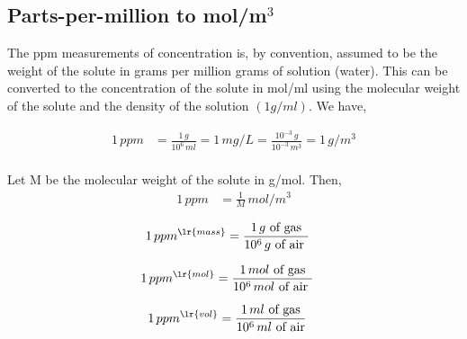 \subsection{Parts-per-million to mol/m$^3$}

The ppm measurements of concentration is, by convention, assumed to be the
weight of the solute in grams per million grams of solution (water). This can be
converted to the concentration of the solute in mol/ml using the molecular
weight of the solute and the density of the solution $(1 g/ml)$. We have,

\begin{align*}
    1 \, ppm &= \frac{1 \, g}{10^6 \, ml} = 1 \, mg/L = \frac{10^{-3} \, g}{10^{-3} \, m^3} = 1 \, g/m^3\\
\end{align*}

Let M be the molecular weight of the solute in g/mol. Then,
\begin{align}
    1 \, ppm &= \frac{1}{M} \, mol/m^3
\end{align}


\begin{align*}
    1 \, ppm^{\lr{mass}} &= \frac{1 \, g\text{ of gas}}{10^6 \, g \text{ of air }}
\end{align*}

\begin{align*}
    1 \, ppm^{\lr{mol}} &= \frac{1 \, mol \text{ of gas}}{10^6 \, mol \text{ of air }}
\end{align*}


\begin{align*}
    1 \, ppm ^{\lr{vol}} &= \frac{1 \, ml \text{ of gas}}{10^6 \, ml \text{ of air}}
\end{align*}
